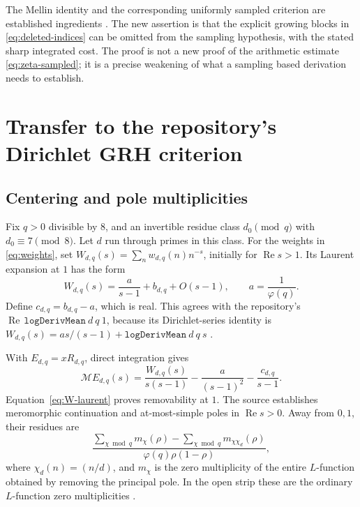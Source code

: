 \documentclass[11pt]{article}
\theoremstyle{definition}
\newcommand{\Rea}{\operatorname{Re}}
\newcommand{\Mell}{\mathcal M}
\begin{document}
The Mellin identity and the corresponding uniformly sampled criterion
are established ingredients \cite{setiawan}. The new assertion is that
the explicit growing blocks in \eqref{eq:deleted-indices} can be omitted
from the sampling hypothesis, with the stated sharp integrated cost.
The proof is not a new proof of the arithmetic estimate
\eqref{eq:zeta-sampled}; it is a precise weakening of what a sampling
based derivation needs to establish.

\section{Transfer to the repository's Dirichlet GRH criterion}
\label{sec:dirichlet}

\subsection{Centering and pole multiplicities}

Fix \(q>0\) divisible by \(8\), and an invertible residue class
\(d_0\pmod q\) with \(d_0\equiv7\pmod8\). Let \(d\) run through
primes in this class. For the weights in \eqref{eq:weights}, set
\(W_{d,q}(s)=\sum_nw_{d,q}(n)n^{-s}\), initially for \(\Rea s>1\).
Its Laurent expansion at \(1\) has the form
\begin{equation}\label{eq:W-laurent}
 W_{d,q}(s)=\frac{a}{s-1}+b_{d,q}+O(s-1),\qquad
 a=\frac1{\varphi(q)}.
\end{equation}
Define \(c_{d,q}=b_{d,q}-a\), which is real. This agrees with the
repository's \(\Rea\,\texttt{logDerivMean}\ d\ q\ 1\), because its
Dirichlet-series identity is
\(W_{d,q}(s)=as/(s-1)+\texttt{logDerivMean}\ d\ q\ s\)
\cite{primeerror}.

With \(E_{d,q}=xR_{d,q}\), direct integration gives
\begin{equation}\label{eq:dirichlet-Mellin}
 \Mell E_{d,q}(s)=\frac{W_{d,q}(s)}{s(s-1)}
              -\frac{a}{(s-1)^2}-\frac{c_{d,q}}{s-1}.
\end{equation}
Equation~\eqref{eq:W-laurent} proves removability at \(1\). The source
establishes meromorphic continuation and at-most-simple poles in
\(\Rea s>0\). Away from \(0,1\), their residues are
\begin{equation}\label{eq:dirichlet-residue}
 \frac{\displaystyle\sum_{\chi\bmod q}m_\chi(\rho)
            -\displaystyle\sum_{\chi\bmod q}m_{\chi\chi_d}(\rho)}
       {\varphi(q)\rho(1-\rho)},
\end{equation}
where \(\chi_d(n)=(n/d)\), and \(m_\chi\) is the zero multiplicity
of the entire \(L\)-function obtained by removing the principal pole.
In the open strip these are the ordinary \(L\)-function zero
multiplicities \cite{primeerror}.
\end{document}
